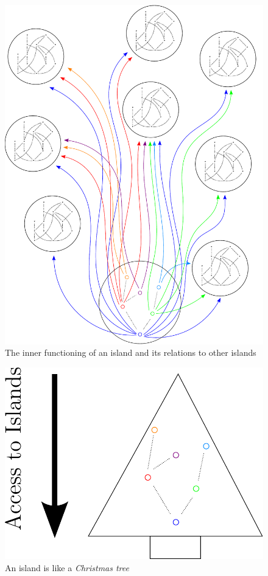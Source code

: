 \begin{figure}[htbp]
\centering
  \includegraphics[height=0.9\textheight]{poset/islands.pdf}
\caption{The inner functioning of an island and its relations to other islands}
\label{fig:islands}
\end{figure}

\begin{figure}[htbp]
\centering
  \includegraphics[]{poset/island.pdf}
\caption{An island is like a \emph{Christmas tree}}
\label{fig:christmas_island}
\end{figure}

